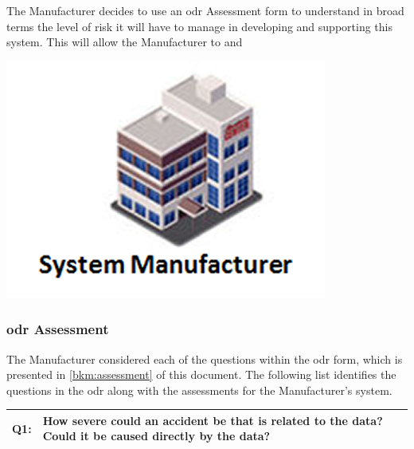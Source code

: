 %
%
\begin{minipage}[t][2cm]{0.73\textwidth}
  The Manufacturer decides to use an \gls{odr} Assessment form to understand in broad terms the level of risk it will have to manage in developing and supporting this system. This will allow the Manufacturer to  and 
\end{minipage}
\begin{minipage}[c][1cm]{0.25\textwidth}
	\vspace{1cm}
  \centering
    \includegraphics[width=\textwidth]{images/manufacturer}
\end{minipage}

\subsubsection{\gls{odr} Assessment}
The Manufacturer considered each of the questions within the \gls{odr} form, which is presented in \autoref{bkm:assessment} of this document.
The following list identifies the questions in the \gls{odr} along with the assessments for the Manufacturer's system.

\begin{longtable*}[H]
  {|L{}|L{}|}
  \hline
  Q1: & How severe could an accident be that is related to the data? Could it be caused directly by the data?\\
  \hline
\end{longtable*}

